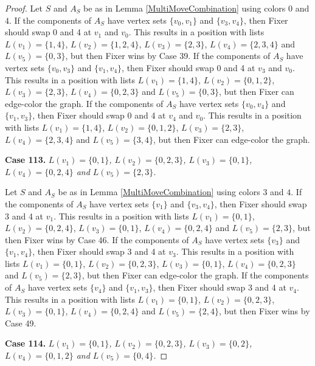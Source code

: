 \documentclass[12pt]{amsart}
\theoremstyle{plain}
\theoremstyle{definition}
\theoremstyle{remark}
\begin{document}
\begin{proof}
Let $S$ and $A_S$ be as in Lemma \ref{MultiMoveCombination} using colors $0$ and $4$. If the components of $A_S$ have vertex sets $\{v_0, v_1\}$ and $\{v_3, v_4\}$, then Fixer should swap 0 and 4 at $v_1$ and $v_0$. This results in a position with lists $L(v_1) = \{1, 4\}$, $L(v_2) = \{1, 2, 4\}$, $L(v_3) = \{2, 3\}$, $L(v_4) = \{2, 3, 4\}$ and $L(v_5) = \{0, 3\}$, but then Fixer wins by Case 39.
If the components of $A_S$ have vertex sets $\{v_0, v_3\}$ and $\{v_1, v_4\}$, then Fixer should swap 0 and 4 at $v_3$ and $v_0$. This results in a position with lists $L(v_1) = \{1, 4\}$, $L(v_2) = \{0, 1, 2\}$, $L(v_3) = \{2, 3\}$, $L(v_4) = \{0, 2, 3\}$ and $L(v_5) = \{0, 3\}$, but then Fixer can edge-color the graph.
If the components of $A_S$ have vertex sets $\{v_0, v_4\}$ and $\{v_1, v_3\}$, then Fixer should swap 0 and 4 at $v_4$ and $v_0$. This results in a position with lists $L(v_1) = \{1, 4\}$, $L(v_2) = \{0, 1, 2\}$, $L(v_3) = \{2, 3\}$, $L(v_4) = \{2, 3, 4\}$ and $L(v_5) = \{3, 4\}$, but then Fixer can edge-color the graph.

\noindent\textbf{Case 113.  }\textit{$L(v_1) = \{0, 1\}$, $L(v_2) = \{0, 2, 3\}$, $L(v_3) = \{0, 1\}$, $L(v_4) = \{0, 2, 4\}$ and $L(v_5) = \{2, 3\}$.}

Let $S$ and $A_S$ be as in Lemma \ref{MultiMoveCombination} using colors $3$ and $4$. If the components of $A_S$ have vertex sets $\{v_1\}$ and $\{v_3, v_4\}$, then Fixer should swap 3 and 4 at $v_1$. This results in a position with lists $L(v_1) = \{0, 1\}$, $L(v_2) = \{0, 2, 4\}$, $L(v_3) = \{0, 1\}$, $L(v_4) = \{0, 2, 4\}$ and $L(v_5) = \{2, 3\}$, but then Fixer wins by Case 46.
If the components of $A_S$ have vertex sets $\{v_3\}$ and $\{v_1, v_4\}$, then Fixer should swap 3 and 4 at $v_3$. This results in a position with lists $L(v_1) = \{0, 1\}$, $L(v_2) = \{0, 2, 3\}$, $L(v_3) = \{0, 1\}$, $L(v_4) = \{0, 2, 3\}$ and $L(v_5) = \{2, 3\}$, but then Fixer can edge-color the graph.
If the components of $A_S$ have vertex sets $\{v_4\}$ and $\{v_1, v_3\}$, then Fixer should swap 3 and 4 at $v_4$. This results in a position with lists $L(v_1) = \{0, 1\}$, $L(v_2) = \{0, 2, 3\}$, $L(v_3) = \{0, 1\}$, $L(v_4) = \{0, 2, 4\}$ and $L(v_5) = \{2, 4\}$, but then Fixer wins by Case 49.

\noindent\textbf{Case 114.  }\textit{$L(v_1) = \{0, 1\}$, $L(v_2) = \{0, 2, 3\}$, $L(v_3) = \{0, 2\}$, $L(v_4) = \{0, 1, 2\}$ and $L(v_5) = \{0, 4\}$.}


\end{proof}
\end{document}
